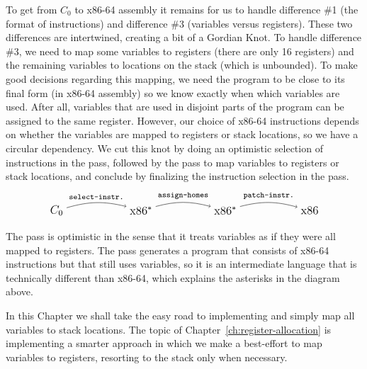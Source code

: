 \documentclass[11pt]{book}
\begin{document}
To get from $C_0$ to x86-64 assembly it remains for us to handle
difference \#1 (the format of instructions) and difference \#3
(variables versus registers). These two differences are intertwined,
creating a bit of a Gordian Knot. To handle difference \#3, we need to
map some variables to registers (there are only 16 registers) and the
remaining variables to locations on the stack (which is unbounded). To
make good decisions regarding this mapping, we need the program to be
close to its final form (in x86-64 assembly) so we know exactly when
which variables are used. After all, variables that are used in
disjoint parts of the program can be assigned to the same register.
However, our choice of x86-64 instructions depends on whether the
variables are mapped to registers or stack locations, so we have a
circular dependency. We cut this knot by doing an optimistic selection
of instructions in the  pass, followed by the
 pass to map variables to registers or stack
locations, and conclude by finalizing the instruction selection in the
 pass.
\[
\begin{tikzpicture}[baseline=(current  bounding  box.center)]
\node (1) at (0,0)  {\large $C_0$};
\node (2) at (3,0)  {\large $\text{x86}^{*}$};
\node (3) at (6,0)  {\large $\text{x86}^{*}$};
\node (4) at (9,0) {\large $\text{x86}$};

\path[->,bend left=15] (1) edge [above] node {\ttfamily\footnotesize select-instr.} (2);
\path[->,bend left=15] (2) edge [above] node {\ttfamily\footnotesize assign-homes} (3);
\path[->,bend left=15] (3) edge [above] node {\ttfamily\footnotesize patch-instr.} (4);
\end{tikzpicture}
\]

The  pass is optimistic in the sense that it
treats variables as if they were all mapped to registers. The
 pass generates a program that consists of
x86-64 instructions but that still uses variables, so it is an
intermediate language that is technically different than x86-64, which
explains the asterisks in the diagram above.

In this Chapter we shall take the easy road to implementing
 and simply map all variables to stack locations.
The topic of Chapter~\ref{ch:register-allocation} is implementing a
smarter approach in which we make a best-effort to map variables to
registers, resorting to the stack only when necessary.

\end{document}
